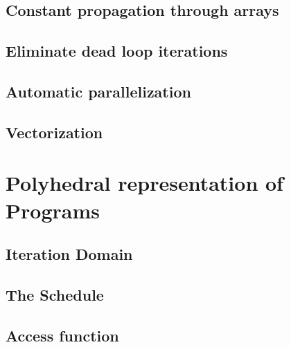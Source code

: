 \subsection{Constant propagation through arrays}
\subsection{Eliminate dead loop iterations}
\subsection{Automatic parallelization}
\subsection{Vectorization}

\section{Polyhedral representation of Programs}
\subsection{Iteration Domain}
\subsection{The Schedule}
\subsection{Access function}
